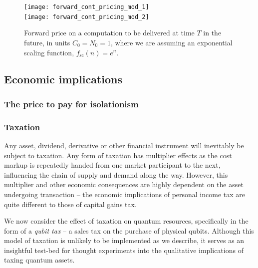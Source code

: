 \begin{figure}[!htb]
\texttt{[image: forward\_cont\_pricing\_mod\_1]}\\
\texttt{[image: forward\_cont\_pricing\_mod\_2]}
\caption{Forward price on a computation to be delivered at time $T$ in the future, in units \mbox{$C_0=N_0=1$}, where we are assuming an exponential scaling function, \mbox{$f_\text{sc}(n)=e^n$}.}\label{fig:forward_cont_pricing_mod}
\end{figure}

%
%

\subsection{Economic implications}


%
%

\subsubsection{The price to pay for isolationism}



%
%

\subsubsection{Taxation}\label{sec:taxation}

Any asset, dividend, derivative or other financial instrument will inevitably be subject to taxation. Any form of taxation has multiplier effects as the cost markup is repeatedly handed from one market participant to the next, influencing the chain of supply and demand along the way. However, this multiplier and other economic consequences are highly dependent on the asset undergoing transaction -- the economic implications of personal income tax are quite different to those of capital gains tax.

We now consider the effect of taxation on quantum resources, specifically in the form of a \textit{qubit tax} -- a sales tax on the purchase of physical qubits. Although this model of taxation is unlikely to be implemented as we describe, it serves as an insightful test-bed for thought experiments into the qualitative implications of taxing quantum assets.

